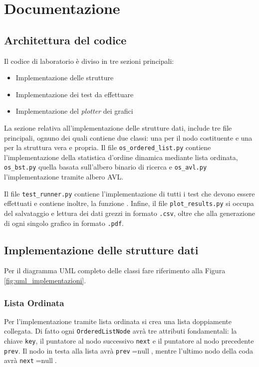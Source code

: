 \section{Documentazione}
\subsection{Architettura del codice}
Il codice di laboratorio è diviso in tre sezioni principali: 
\begin{itemize}
	\item Implementazione delle strutture
	\item Implementazione dei test da effettuare
	\item Implementazione del \textit{plotter} dei grafici
\end{itemize}

La sezione relativa all'implementazione delle strutture dati, include tre file principali, ognuno dei quali contiene due classi: una per il nodo costituente e una per la struttura vera e propria. Il file \texttt{os\_ordered\_list.py} contiene l’implementazione della statistica d’ordine dinamica mediante lista ordinata, \texttt{os\_bst.py} quella basata sull’albero binario di ricerca e \texttt{os\_avl.py} l’implementazione tramite albero AVL.

Il file \texttt{test\_runner.py} contiene l'implementazione di tutti i test che devono essere effettuati e contiene inoltre, la funzione . 
Infine, il file \texttt{plot\_results.py} si occupa del salvataggio e lettura dei dati grezzi in formato \texttt{.csv}, oltre che alla generazione di ogni singolo grafico in formato \texttt{.pdf}.


\subsection{Implementazione delle strutture dati}
Per il diagramma UML completo delle classi fare riferimento alla Figura \ref{fig:uml_implementazioni}.

\subsubsection*{Lista Ordinata}
Per l'implementazione tramite lista ordinata si crea una lista doppiamente collegata. Di fatto ogni \texttt{OrderedListNode} avrà tre attributi fondamentali: la chiave \texttt{key}, il puntatore al nodo successivo \texttt{next} e il puntatore al nodo precedente \texttt{prev}. Il nodo in testa alla lista avrà \texttt{prev}$= \text{null}$, mentre l'ultimo nodo della coda avrà \texttt{next}$= \text{null}$.

